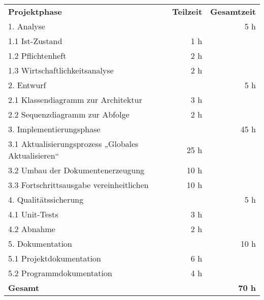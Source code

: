 \begin{tabular}{lrr}
\rowcolor{heading}\textbf{Projektphase} & \textbf{Teilzeit} & \textbf{Gesamtzeit} \\
1. Analyse & & 5 h \\
\rowcolor{odd}1.1 Ist-Zustand & 1 h & \\
1.2 Pflichtenheft & 2 h & \\
\rowcolor{odd}1.3 Wirtschaftlichkeitsanalyse & 2 h & \\
2. Entwurf & & 5 h \\
\rowcolor{odd}2.1 Klassendiagramm zur Architektur & 3 h & \\
2.2 Sequenzdiagramm zur Abfolge & 2 h & \\
\rowcolor{odd}3. Implementierungsphase & & 45 h \\
3.1 Aktualisierungsprozess „Globales Aktualisieren“ & 25 h & \\
\rowcolor{odd}3.2 Umbau der Dokumentenerzeugung & 10 h & \\
3.3 Fortschrittsausgabe  vereinheitlichen & 10 h & \\
\rowcolor{odd}4. Qualitätssicherung & & 5 h \\
4.1 Unit-Tests & 3 h & \\
\rowcolor{odd}4.2 Abnahme & 2 h & \\
5. Dokumentation & & 10 h \\
\rowcolor{odd}5.1 Projektdokumentation & 6 h & \\
5.2 Programmdokumentation & 4 h & \\
\hline
\rowcolor{heading}\textbf{Gesamt} & & \textbf{70 h} \\
\end{tabular}
